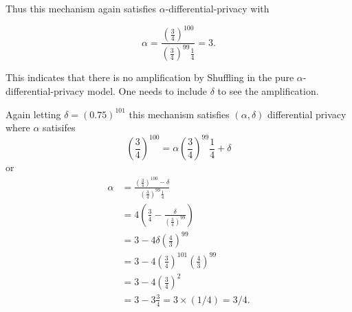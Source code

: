 \documentclass[oneside,12pt]{amsart}
\begin{document}
Thus this mechanism again satisfies $\alpha$-differential-privacy with 

$$\alpha=\frac{(\frac{3}{4})^{100}}{(\frac{3}{4})^{99}\frac{1}{4}}=3.$$

This indicates that there is no amplification by Shuffling in the pure $\alpha$-differential-privacy
model. One needs to include $\delta$ to see the amplification.

Again letting $\delta=(0.75)^{101}$ this mechanism satisfies $(\alpha,\delta)$ differential privacy
where $\alpha$ satisifes
$$\left(\frac{3}{4}\right)^{100} = \alpha \left(\frac{3}{4}\right)^{99}\frac{1}{4} + \delta$$
or
\begin{align*}
\alpha &=\frac{(\frac{3}{4})^{100} - \delta}{(\frac{3}{4})^{99}\frac{1}{4}} \\
&= 4\left(\frac{3}{4}  - \frac{\delta}{\left(\frac{3}{4}\right)^{99}} \right) \\
&= 3 - 4\delta\left(\frac{4}{3}\right)^{99} \\
&= 3 - 4(\frac{3}{4})^{101}\left(\frac{4}{3}\right)^{99} \\
&= 3 - 4\left(\frac{3}{4}\right)^2 \\
&= 3 - 3\frac{3}{4} = 3 \times (1/4) = 3/4.
\end{align*}




\end{document}
